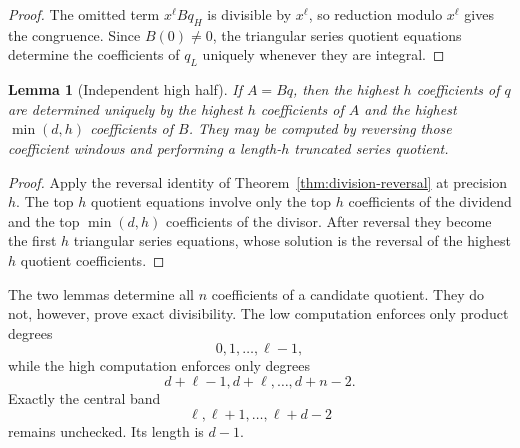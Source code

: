 \documentclass[11pt]{book}
\newtheorem{lemma}[theorem]{Lemma}
\theoremstyle{definition}
\begin{document}
\begin{proof}
The omitted term $x^\ell Bq_H$ is divisible by $x^\ell$, so reduction modulo
$x^\ell$ gives the congruence.  Since $B(0)\ne0$, the triangular series
quotient equations determine the coefficients of $q_L$ uniquely whenever they
are integral.
\end{proof}

\begin{lemma}[Independent high half]\label{lem:bidirectional-high}
If $A=Bq$, then the highest $h$ coefficients of $q$ are determined uniquely by
the highest $h$ coefficients of $A$ and the highest $\min(d,h)$ coefficients
of $B$.  They may be computed by reversing those coefficient windows and
performing a length-$h$ truncated series quotient.
\end{lemma}

\begin{proof}
Apply the reversal identity of
Theorem~\ref{thm:division-reversal} at precision $h$.  The top $h$ quotient
equations involve only the top $h$ coefficients of the dividend and the top
$\min(d,h)$ coefficients of the divisor.  After reversal they become the
first $h$ triangular series equations, whose solution is the reversal of the
highest $h$ quotient coefficients.
\end{proof}

The two lemmas determine all $n$ coefficients of a candidate quotient.  They
do not, however, prove exact divisibility.  The low computation enforces only
product degrees
\[
 0,1,\ldots,\ell-1,
\]
while the high computation enforces only degrees
\[
 d+\ell-1,d+\ell,\ldots,d+n-2.
\]
Exactly the central band
\begin{equation}\label{eq:bidirectional-central-window}
 \ell,\ell+1,\ldots,\ell+d-2
\end{equation}
remains unchecked.  Its length is $d-1$.
\end{document}
